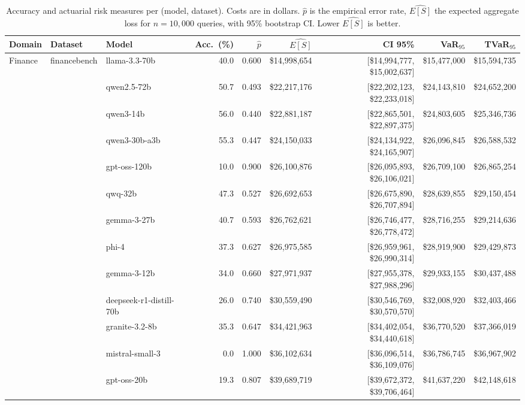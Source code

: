 \begin{table}[t]
\centering\footnotesize
\caption{Accuracy and actuarial risk measures per (model, dataset).
Costs are in dollars. $\hat{p}$ is the empirical error rate, $\widehat{E[S]}$ the
expected aggregate loss for $n{=}10{,}000$ queries, with 95\% bootstrap CI.
Lower $\widehat{E[S]}$ is better.}
\label{tab:main-results}
\begin{tabular}{lllrrrrrr}
\toprule
Domain & Dataset & Model & Acc.~(\%) & $\hat{p}$ & $\widehat{E[S]}$ & CI 95\% & VaR$_{95}$ & TVaR$_{95}$ \\
\midrule
  Finance & financebench & llama-3.3-70b & 40.0 & 0.600 & \$14,998,654 & [\$14,994,777, \$15,002,637] & \$15,477,000 & \$15,594,735 \\
   &  & qwen2.5-72b & 50.7 & 0.493 & \$22,217,176 & [\$22,202,123, \$22,233,018] & \$24,143,810 & \$24,652,200 \\
   &  & qwen3-14b & 56.0 & 0.440 & \$22,881,187 & [\$22,865,501, \$22,897,375] & \$24,803,605 & \$25,346,736 \\
   &  & qwen3-30b-a3b & 55.3 & 0.447 & \$24,150,033 & [\$24,134,922, \$24,165,907] & \$26,096,845 & \$26,588,532 \\
   &  & gpt-oss-120b & 10.0 & 0.900 & \$26,100,876 & [\$26,095,893, \$26,106,021] & \$26,709,100 & \$26,865,254 \\
   &  & qwq-32b & 47.3 & 0.527 & \$26,692,653 & [\$26,675,890, \$26,707,894] & \$28,639,855 & \$29,150,454 \\
   &  & gemma-3-27b & 40.7 & 0.593 & \$26,762,621 & [\$26,746,477, \$26,778,472] & \$28,716,255 & \$29,214,636 \\
   &  & phi-4 & 37.3 & 0.627 & \$26,975,585 & [\$26,959,961, \$26,990,314] & \$28,919,900 & \$29,429,873 \\
   &  & gemma-3-12b & 34.0 & 0.660 & \$27,971,937 & [\$27,955,378, \$27,988,296] & \$29,933,155 & \$30,437,488 \\
   &  & deepseek-r1-distill-70b & 26.0 & 0.740 & \$30,559,490 & [\$30,546,769, \$30,570,570] & \$32,008,920 & \$32,403,466 \\
   &  & granite-3.2-8b & 35.3 & 0.647 & \$34,421,963 & [\$34,402,054, \$34,440,618] & \$36,770,520 & \$37,366,019 \\
   &  & mistral-small-3 & 0.0 & 1.000 & \$36,102,634 & [\$36,096,514, \$36,109,076] & \$36,786,745 & \$36,967,902 \\
   &  & gpt-oss-20b & 19.3 & 0.807 & \$39,689,719 & [\$39,672,372, \$39,706,464] & \$41,637,220 & \$42,148,618 \\

\end{tabular}
\end{table}
